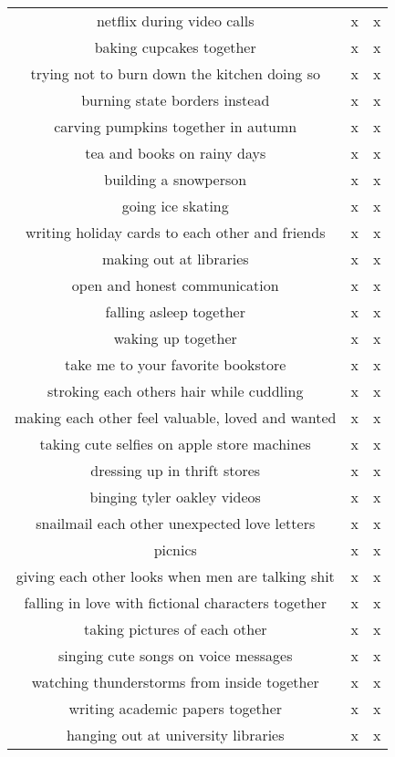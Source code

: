 \documentclass[a4paper]{article}
\begin{document}
\begin{table}[htb]
\begin{adjustbox}{width=1\textwidth}
\begin{tabular}{@{}ccc@{}}
        netflix during video calls &  x &  x \\
        baking cupcakes together &  x &  x \\
        trying not to burn down the kitchen doing so &  x &  x \\
        burning state borders instead &  x &  x \\
        carving pumpkins together in autumn &  x &  x \\
        tea and books on rainy days &  x &  x \\
        building a snowperson &  x &  x \\
        going ice skating &  x &  x \\
        writing holiday cards to each other and friends &  x &  x \\
        making out at libraries &  x &  x \\
        open and honest communication &  x &  x \\
        falling asleep together &  x &  x \\
        waking up together &  x &  x \\
        take me to your favorite bookstore &  x &  x \\
        stroking each others hair while cuddling &  x &  x \\
        making each other feel valuable, loved and wanted &  x &  x \\
        taking cute selfies on apple store machines &  x &  x \\
        dressing up in thrift stores &  x &  x \\
        binging tyler oakley videos &  x &  x \\
        snailmail each other unexpected love letters &  x &  x \\
        picnics &  x &  x \\
        giving each other looks when men are talking shit &  x &  x \\
        falling in love with fictional characters together &  x &  x \\
        taking pictures of each other &  x &  x \\
        singing cute songs on voice messages &  x &  x \\
        watching thunderstorms from inside together &  x &  x \\
        writing academic papers together &  x &  x \\
        hanging out at university libraries &  x &  x \\

\end{tabular}
\end{adjustbox}
\end{table}
\end{document}
